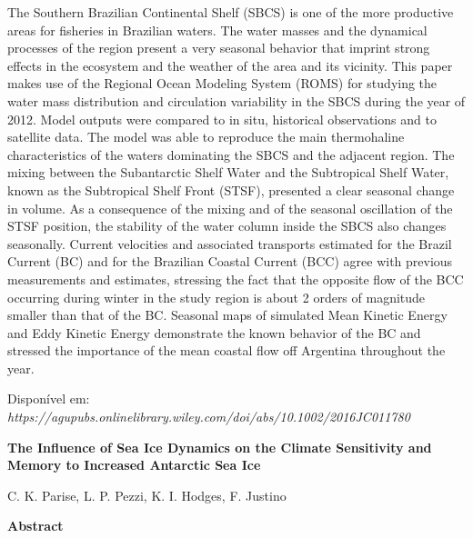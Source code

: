 \noindent The Southern Brazilian Continental Shelf (SBCS) is one of the more productive areas for fisheries in Brazilian waters. The water masses and the dynamical processes of the region present a very seasonal behavior that imprint strong effects in the ecosystem and the weather of the area and its vicinity. This paper makes use of the Regional Ocean Modeling System (ROMS) for studying the water mass distribution and circulation variability in the SBCS during the year of 2012. Model outputs were compared to in situ, historical observations and to satellite data. The model was able to reproduce the main thermohaline characteristics of the waters dominating the SBCS and the adjacent region. The mixing between the Subantarctic Shelf Water and the Subtropical Shelf Water, known as the Subtropical Shelf Front (STSF), presented a clear seasonal change in volume. As a consequence of the mixing and of the seasonal oscillation of the STSF position, the stability of the water column inside the SBCS also changes seasonally. Current velocities and associated transports estimated for the Brazil Current (BC) and for the Brazilian Coastal Current (BCC) agree with previous measurements and estimates, stressing the fact that the opposite flow of the BCC occurring during winter in the study region is about 2 orders of magnitude smaller than that of the BC. Seasonal maps of simulated Mean Kinetic Energy and Eddy Kinetic Energy demonstrate the known behavior of the BC and stressed the importance of the mean coastal flow off Argentina throughout the year.
\bigskip

\noindent {}
\bigskip

\noindent Disponível em: \textcolor{bleu_cite}{\textit{https://agupubs.onlinelibrary.wiley.com/doi/abs/10.1002/2016JC011780}}
\bigskip


\newpage
\bigskip

\noindent \begin{center} \textbf{The Influence of Sea Ice Dynamics on the Climate Sensitivity and Memory to Increased Antarctic Sea Ice}
\bigskip

\noindent C. K. Parise, L. P. Pezzi, K. I. Hodges, F. Justino
\bigskip

\noindent \textbf{Abstract}\end{center}
\bigskip


